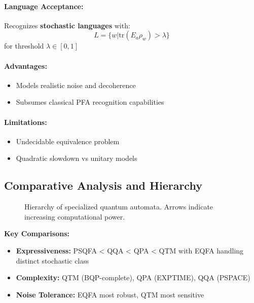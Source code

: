 \paragraph{Language Acceptance:}
Recognizes \textbf{stochastic languages} with:
\[
L = \{w | \text{tr}(E_a \rho_w) > \lambda\}
\]
for threshold $\lambda \in [0,1]$ \cite{hirvensalo2012quantum}

\paragraph{Advantages:}
\begin{itemize}
    \item Models realistic noise and decoherence
    \item Subsumes classical PFA recognition capabilities
\end{itemize}

\paragraph{Limitations:}
\begin{itemize}
    \item Undecidable equivalence problem
    \item Quadratic slowdown vs unitary models
\end{itemize}

\subsection*{Comparative Analysis and Hierarchy}
\begin{figure}[h]
\centering
{}
\caption{Hierarchy of specialized quantum automata. Arrows indicate increasing computational power.}
\label{fig:specialized-hierarchy}
\end{figure}

\textbf{Key Comparisons:}
\begin{itemize}
    \item \textbf{Expressiveness:} PSQFA < QQA < QPA < QTM with EQFA handling distinct stochastic class
    \item \textbf{Complexity:} QTM (BQP-complete), QPA (EXPTIME), QQA (PSPACE)
    \item \textbf{Noise Tolerance:} EQFA most robust, QTM most sensitive
\end{itemize}